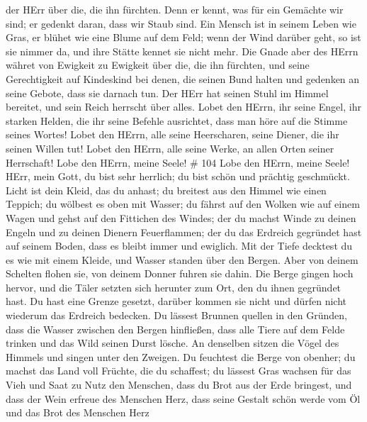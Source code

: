 der HErr über die, die ihn fürchten.  Denn er kennt, was
für ein Gemächte wir sind; er gedenkt daran, dass wir Staub sind.
 Ein Mensch ist in seinem Leben wie Gras, er blühet wie
eine Blume auf dem Feld;  wenn der Wind darüber geht, so
ist sie nimmer da, und ihre Stätte kennet sie nicht mehr. 
Die Gnade aber des HErrn währet von Ewigkeit zu Ewigkeit über die, die
ihn fürchten, und seine Gerechtigkeit auf Kindeskind  bei
denen, die seinen Bund halten und gedenken an seine Gebote, dass sie
darnach tun.  Der HErr hat seinen Stuhl im Himmel bereitet,
und sein Reich herrscht über alles.  Lobet den HErrn, ihr
seine Engel, ihr starken Helden, die ihr seine Befehle ausrichtet, dass
man höre auf die Stimme seines Wortes!  Lobet den HErrn,
alle seine Heerscharen, seine Diener, die ihr seinen Willen tut!
 Lobet den HErrn, alle seine Werke, an allen Orten seiner
Herrschaft! Lobe den HErrn, meine Seele! \# 104  Lobe den
HErrn, meine Seele! HErr, mein Gott, du bist sehr herrlich; du bist
schön und prächtig geschmückt.  Licht ist dein Kleid, das du
anhast; du breitest aus den Himmel wie einen Teppich;  du
wölbest es oben mit Wasser; du fährst auf den Wolken wie auf einem Wagen
und gehst auf den Fittichen des Windes;  der du machst Winde
zu deinen Engeln und zu deinen Dienern Feuerflammen;  der du
das Erdreich gegründet hast auf seinem Boden, dass es bleibt immer und
ewiglich.  Mit der Tiefe decktest du es wie mit einem
Kleide, und Wasser standen über den Bergen.  Aber von deinem
Schelten flohen sie, von deinem Donner fuhren sie dahin. 
Die Berge gingen hoch hervor, und die Täler setzten sich herunter zum
Ort, den du ihnen gegründet hast.  Du hast eine Grenze
gesetzt, darüber kommen sie nicht und dürfen nicht wiederum das Erdreich
bedecken.  Du lässest Brunnen quellen in den Gründen, dass
die Wasser zwischen den Bergen hinfließen,  dass alle Tiere
auf dem Felde trinken und das Wild seinen Durst lösche.  An
denselben sitzen die Vögel des Himmels und singen unter den Zweigen.
 Du feuchtest die Berge von obenher; du machst das Land
voll Früchte, die du schaffest;  du lässest Gras wachsen
für das Vieh und Saat zu Nutz den Menschen, dass du Brot aus der Erde
bringest,  und dass der Wein erfreue des Menschen Herz,
dass seine Gestalt schön werde vom Öl und das Brot des Menschen Herz
